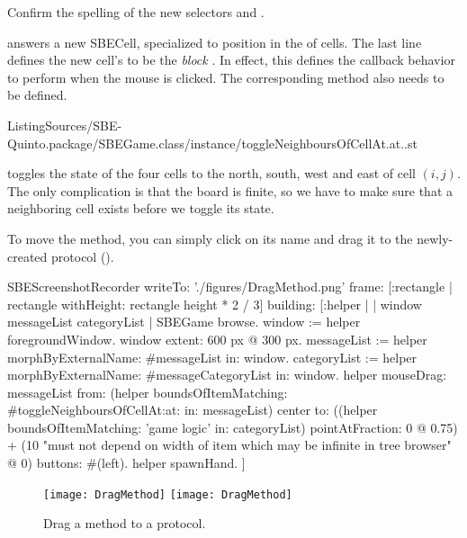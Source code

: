 \documentclass[a4paper,10pt,twoside]{book}
\begin{document}
Confirm the spelling of the new selectors  and .

 answers a new SBECell, specialized to position  in the  of cells.
The last line defines the new cell's  to be the \emph{block}
\mbox{.}
In effect, this defines the callback behavior to perform when the mouse is clicked.
The corresponding method also needs to be defined.

%
{ListingSources/SBE-Quinto.package/SBEGame.class/instance/toggleNeighboursOfCellAt.at..st}

 toggles the state of the four cells to the north, south, west and east of cell $(i, j)$.
The only complication is that the board is finite, so we have to make sure that a neighboring cell exists before we toggle its state.

To move the method, you can simply click on its name and drag it to the newly-created protocol ().

\begin{ExecuteSmalltalkScript}
SBEScreenshotRecorder writeTo: './figures/DragMethod.png' frame: [:rectangle | rectangle withHeight: rectangle height * 2 / 3] building: [:helper |
	| window messageList categoryList |
	SBEGame browse.
	window := helper foregroundWindow.
	window extent: 600 px @ 300 px.
	messageList := helper morphByExternalName: #messageList in: window.
	categoryList := helper morphByExternalName: #messageCategoryList in: window.
	helper
		mouseDrag: messageList
		from: (helper boundsOfItemMatching: #toggleNeighboursOfCellAt:at: in: messageList) center
		to: ((helper boundsOfItemMatching: 'game logic' in: categoryList) pointAtFraction: 0 @ 0.75) + (10 "must not depend on width of item which may be infinite in tree browser" @ 0)
		buttons: #(left).
	helper spawnHand.
]
\end{ExecuteSmalltalkScript}
\begin{figure}[htbp]
   \centering
   \ifluluelse
		{\texttt{[image: DragMethod]} }
		{\texttt{[image: DragMethod]} }
	\caption{Drag a method to a protocol.\label{fig:dragMethod}}
\end{figure}
\end{document}
